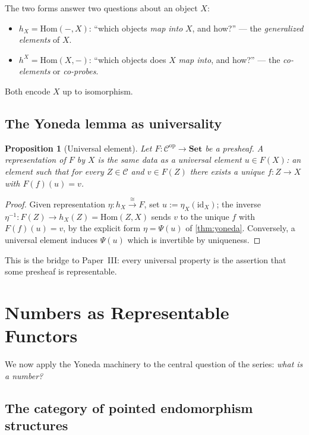 \documentclass[12pt]{article}
\newtheorem{proposition}[theorem]{Proposition}
\theoremstyle{definition}
\theoremstyle{remark}
\begin{document}
The two forms answer two questions about an object $X$:
\begin{itemize}
\item $h_X = \mathrm{Hom}(-, X)$: ``which objects \emph{map into} $X$, and how?'' --- the \emph{generalized elements} of $X$.
\item $h^X = \mathrm{Hom}(X, -)$: ``which objects does $X$ \emph{map into}, and how?'' --- the \emph{co-elements} or \emph{co-probes}.
\end{itemize}
Both encode $X$ up to isomorphism.

\subsection{The Yoneda lemma as universality}

\begin{proposition}[Universal element]
\label{prop:universal-element}
Let $F\colon \mathcal{C}^{\mathrm{op}} \to \mathbf{Set}$ be a presheaf. A representation of $F$ by $X$ is the same data as a \emph{universal element} $u \in F(X)$: an element such that for every $Z \in \mathcal{C}$ and $v \in F(Z)$ there exists a unique $f\colon Z \to X$ with $F(f)(u) = v$.
\end{proposition}

\begin{proof}
Given representation $\eta\colon h_X \xrightarrow{\cong} F$, set $u := \eta_X(\mathrm{id}_X)$; the inverse $\eta^{-1}\colon F(Z) \to h_X(Z) = \mathrm{Hom}(Z, X)$ sends $v$ to the unique $f$ with $F(f)(u) = v$, by the explicit form $\eta = \Psi(u)$ of \cref{thm:yoneda}. Conversely, a universal element induces $\Psi(u)$ which is invertible by uniqueness.
\end{proof}

This is the bridge to Paper~III: every universal property is the assertion that some presheaf is representable.

\section{Numbers as Representable Functors}
\label{sec:numbers-as-functors}

We now apply the Yoneda machinery to the central question of the series: \emph{what is a number?}

\subsection{The category of pointed endomorphism structures}
\end{document}
